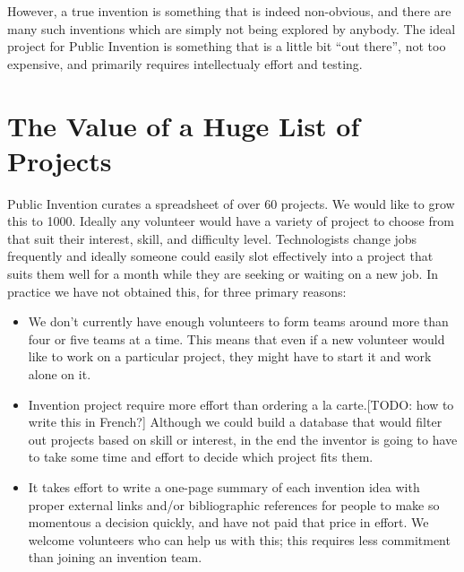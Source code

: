 \documentclass[
	fontsize=10pt, %
	twoside=false, %
	secnumdepth=1, %
]{kaobook}
\begin{document}
However, a true invention is something that is indeed non-obvious, and there
are many such inventions which are simply not being explored by anybody.
The ideal project for Public Invention is something that is a
little bit ``out there'', not too expensive, and primarily requires
intellectualy effort and testing.



\section{The Value of a Huge List of Projects}


Public Invention curates a spreadsheet of over 60 projects.
We would like to grow this to 1000. Ideally any volunteer
would have a variety of project to choose from that suit
their interest, skill, and difficulty level.
Technologists change jobs frequently and ideally someone
could easily slot effectively into a project that suits them well for a
month while they are seeking or waiting on a new job.
In practice we have not obtained this, for three primary
reasons:
\begin{itemize}
\item We don't currently have enough volunteers to form teams around
  more than four or five teams at a time. This means that even
  if a new volunteer would like to work on a particular project,
  they might have to start it and work alone on it.
\item Invention project require more effort than ordering a la carte.[TODO: how to write this in French?]
  Although we could build a database that would filter out projects based on
  skill or interest, in the end the inventor is going to have to take some
  time and effort to decide which project fits them.
\item It takes effort to write a one-page summary of each invention
  idea with proper external links and/or bibliographic references for
  people to make so momentous a decision quickly, and have not paid
  that price in effort. We welcome volunteers who can help us with this;
  this requires less commitment than joining an invention team.
  \end{itemize}
\end{document}
